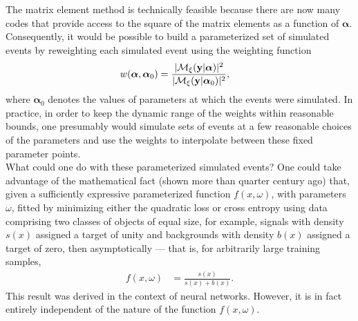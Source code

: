 The matrix element method is technically feasible because there are now many codes that provide access to the square of the matrix elements as a function of ${\boldsymbol\alpha}$. Consequently, it would be possible to build a parameterized set of simulated events by reweighting each simulated event using the weighting function
\begin{align}
 w(\boldsymbol{\alpha}, \boldsymbol{\alpha}_0) & = \frac{|\mathcal{M}_{\xi}({\bf y}|\boldsymbol\alpha)|^2}{|\mathcal{M}_{\xi}({\bf y}|\boldsymbol\alpha_0)|^2},
\end{align}
where $\boldsymbol{\alpha}_0$ denotes the values of parameters at which the events were simulated. In practice, in order to keep the dynamic range of the weights within reasonable bounds, one presumably would simulate sets of events at a few reasonable choices of the parameters and use the weights to interpolate between these fixed parameter points.\\

What could one do with these parameterized simulated events? One could take advantage of the mathematical fact (shown more than quarter century ago) that, given a sufficiently expressive parameterized function $f(x, \omega)$, with parameters $\omega$, fitted by minimizing either the quadratic loss or cross entropy using data comprising two classes of objects of equal size, for example, signals with density $s(x)$ assigned a target of unity and backgrounds with density $b(x)$ assigned a target of zero, then asymptotically --- that is, for arbitrarily large training samples,
\begin{align}
 f(x, \omega) & = \frac{s(x)}{s(x) + b(x)}.
 \label{eqn:discriminant}
\end{align}
This result was derived in the context of neural networks. However, it is in fact entirely independent of the nature of the function
$f(x, \omega)$.\\

